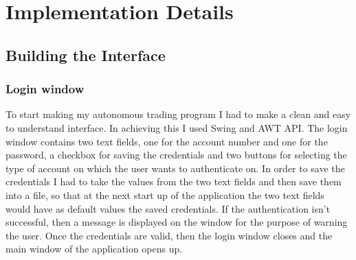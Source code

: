 \documentclass[12pt,a4paper]{report}
\begin{document}
\chapter{Implementation Details}

\section{Building the Interface}
\subsection{Login window}
To start making my autonomous trading program I had to make a clean and easy to understand interface. In achieving this I used Swing and AWT API. The login window contains two text fields, one for the account number and one for the password, a checkbox for saving the credentials and two buttons for selecting the type of account on which the user wants to authenticate on. In order to save the credentials I had to take the values from the two text fields and then save them into a file, so that at the next start up of the application the two text fields would have as default values the saved credentials. If the authentication isn't successful, then a message is displayed on the window for the purpose of warning the user. Once the credentials are valid, then the login window closes and the main window of the application opens up.
\end{document}

